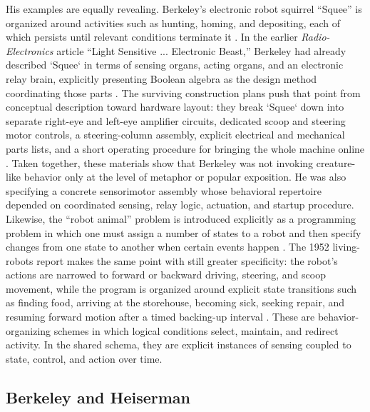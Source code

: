 \documentclass[11pt]{article}
\begin{document}
His examples are equally revealing. Berkeley's electronic robot squirrel ``Squee'' is organized around activities such as hunting, homing, and depositing, each of which persists until relevant conditions terminate it \citep[pp.~177--180]{berkeley1959symbolic}. In the earlier \emph{Radio-Electronics} article ``Light Sensitive ... Electronic Beast,'' Berkeley had already described `Squee` in terms of sensing organs, acting organs, and an electronic relay brain, explicitly presenting Boolean algebra as the design method coordinating those parts \citep[pp.~46--47]{berkeley1951electronicbeast}. The surviving construction plans push that point from conceptual description toward hardware layout: they break `Squee` down into separate right-eye and left-eye amplifier circuits, dedicated scoop and steering motor controls, a steering-column assembly, explicit electrical and mechanical parts lists, and a short operating procedure for bringing the whole machine online \citep{berkeley1952squeeconstruction}. Taken together, these materials show that Berkeley was not invoking creature-like behavior only at the level of metaphor or popular exposition. He was also specifying a concrete sensorimotor assembly whose behavioral repertoire depended on coordinated sensing, relay logic, actuation, and startup procedure. Likewise, the ``robot animal'' problem is introduced explicitly as a programming problem in which one must assign a number of states to a robot and then specify changes from one state to another when certain events happen \citep[pp.~177, 180--181]{berkeley1959symbolic}. The 1952 living-robots report makes the same point with still greater specificity: the robot's actions are narrowed to forward or backward driving, steering, and scoop movement, while the program is organized around explicit state transitions such as finding food, arriving at the storehouse, becoming sick, seeking repair, and resuming forward motion after a timed backing-up interval \citep{berkeley1952livingrobots}. These are behavior-organizing schemes in which logical conditions select, maintain, and redirect activity. In the shared schema, they are explicit instances of sensing coupled to state, control, and action over time.

\subsection*{Berkeley and Heiserman}
\end{document}
